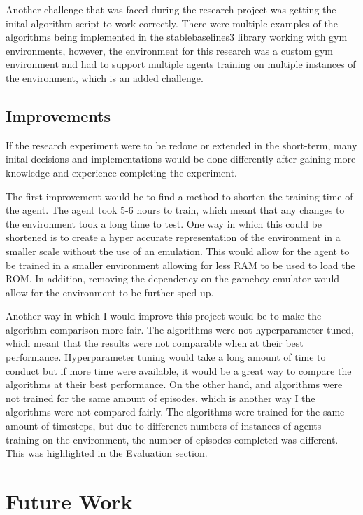 Another challenge that was faced during the research project was getting the inital algorithm script to work correctly. There were multiple examples of the algorithms being implemented in the stablebaselines3 library working with gym environments, however, the environment for this research was a custom gym environment and had to support multiple agents training on multiple instances of the environment, which is an added challenge. 

\subsection{Improvements}

If the research experiment were to be redone or extended in the short-term, many inital decisions and implementations would be done differently after gaining more knowledge and experience completing the experiment. 

The first improvement would be to find a method to shorten the training time of the agent. The agent took 5-6 hours to train, which meant that any changes to the environment took a long time to test. One way in which this could be shortened is to create a hyper accurate representation of the environment in a smaller scale without the use of an emulation. This would allow for the agent to be trained in a smaller environment allowing for less RAM to be used to load the ROM. In addition, removing the dependency on the gameboy emulator would allow for the environment to be further sped up. 

Another way in which I would improve this project would be to make the algorithm comparison more fair. The algorithms were not hyperparameter-tuned, which meant that the results were not comparable when at their best performance. Hyperparameter tuning would take a long amount of time to conduct but if more time were available, it would be a great way to compare the algorithms at their best performance. On the other hand, and algorithms were not trained for the same amount of episodes, which is another way I the algorithms were not compared fairly. The algorithms were trained for the same amount of timesteps, but due to differenct numbers of instances of agents training on the environment, the number of episodes completed was different. This was highlighted in the Evaluation section.

\newpage

\section{Future Work}

